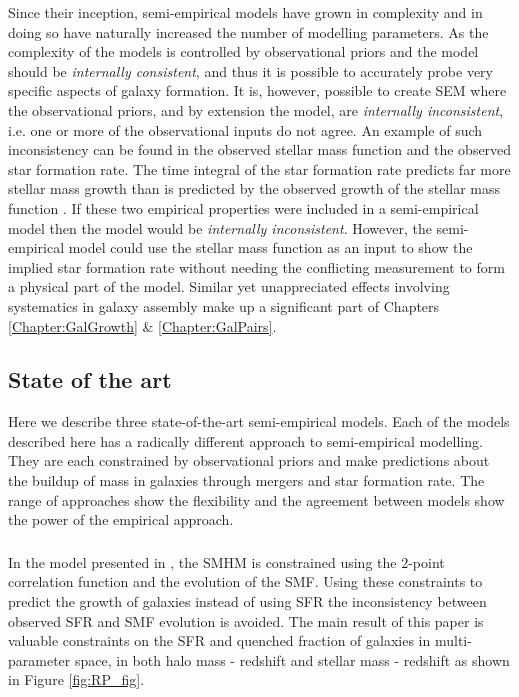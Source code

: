 Since their inception, semi-empirical models have grown in complexity and in doing so have naturally increased the number of modelling parameters. As the complexity of the models is controlled by observational priors and the model should be \textit{internally consistent}, and thus it is possible to accurately probe very specific aspects of galaxy formation. It is, however, possible to create SEM where the observational priors, and by extension the model, are \textit{internally inconsistent}, i.e. one or more of the observational inputs do not agree. An example of such inconsistency can be found in the observed stellar mass function and the observed star formation rate. The time integral of the star formation rate predicts far more stellar mass growth than is predicted by the observed growth of the stellar mass function \citep{Leja2015ReconcilingFunction,Lapi2017StellarEquation}. If these two empirical properties were included in a semi-empirical model then the model would be \textit{internally inconsistent}. However, the semi-empirical model could use the stellar mass function as an input to show the implied star formation rate without needing the conflicting measurement to form a physical part of the model. Similar yet unappreciated effects involving systematics in galaxy assembly make up a significant part of Chapters \ref{Chapter:GalGrowth} \& \ref{Chapter:GalPairs}.

\subsection{State of the art}
Here we describe three state-of-the-art semi-empirical models. Each of the models described here has a radically different approach to semi-empirical modelling. They are each constrained by observational priors and make predictions about the buildup of mass in galaxies through mergers and star formation rate. The range of approaches show the flexibility and the agreement between models show the power of the empirical approach. 


\subsubsection{\citet{Rodriguez-Puebla2017ConstrainingProperties}}
In the model presented in \citet{Rodriguez-Puebla2017ConstrainingProperties}, the SMHM is constrained using the 2-point correlation function and the evolution of the SMF. Using these constraints to predict the growth of galaxies instead of using SFR the inconsistency between observed SFR and SMF evolution is avoided. The main result of this paper is valuable constraints on the SFR and quenched fraction of galaxies in multi-parameter space, in both halo mass - redshift and stellar mass - redshift as shown in Figure \ref{fig:RP_fig}.

